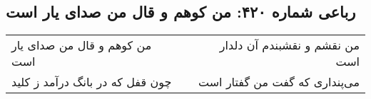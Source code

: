 \begin{center}
\section*{رباعی شماره ۴۲۰: من کوهم و قال من صدای یار است}
\label{sec:0420}
\begin{longtable}{l p{0.5cm} r}
من کوهم و قال من صدای یار است
&&
من نقشم و نقشبندم آن دلدار است
\\
چون قفل که در بانگ درآمد ز کلید
&&
می‌پنداری که گفت من گفتار است
\\
\end{longtable}
\end{center}
